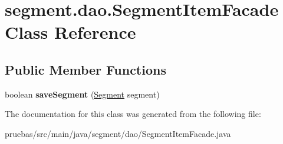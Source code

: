 \hypertarget{classsegment_1_1dao_1_1_segment_item_facade}{}\section{segment.\+dao.\+Segment\+Item\+Facade Class Reference}
\label{classsegment_1_1dao_1_1_segment_item_facade}
\subsection*{Public Member Functions}
\begin{DoxyCompactItemize}
\item 
\mbox{\label{classsegment_1_1dao_1_1_segment_item_facade_a8e3e0e8f81f5e81d5715c9e1cdfa535b}} 
boolean {\bfseries save\+Segment} (\mbox{\hyperlink{classclases_1_1_segment}{Segment}} segment)
\end{DoxyCompactItemize}


The documentation for this class was generated from the following file\+:\begin{DoxyCompactItemize}
\item 
pruebas/src/main/java/segment/dao/Segment\+Item\+Facade.\+java\end{DoxyCompactItemize}
